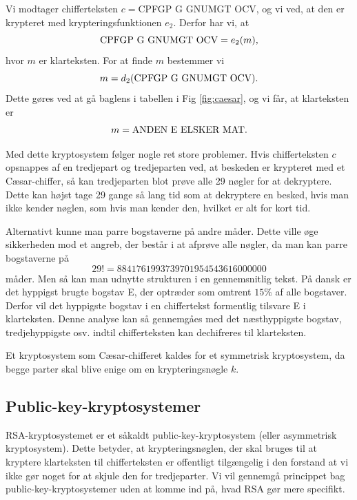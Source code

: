 \documentclass[12pt]{article}
\begin{document}
\begin{exa}
Vi modtager chifferteksten $c=$CPFGP G GNUMGT OCV, og vi ved, at den er krypteret med krypteringsfunktionen $e_2$. Derfor har vi, at 
\[
\textnormal{CPFGP G GNUMGT OCV} = e_2(m),
\]
hvor $m$ er klarteksten. For at finde $m$ bestemmer vi
\[
m = d_2(\textnormal{CPFGP G GNUMGT OCV}).
\]
Dette gøres ved at gå baglens i tabellen i Fig \ref{fig:caesar}, og vi får, at klarteksten er
\begin{align*}
m = \textnormal{ANDEN E ELSKER MAT}.
\end{align*}
\end{exa}
Med dette kryptosystem følger nogle ret store problemer. Hvis chifferteksten $c$ opsnappes af en tredjepart og tredjeparten ved, at beskeden er krypteret med et Cæsar-chiffer, så kan tredjeparten blot prøve alle 29 nøgler for at dekryptere. Dette kan højst tage 29 gange så lang tid som at dekryptere en besked, hvis man ikke kender nøglen, som hvis man kender den, hvilket er alt for kort tid. 

Alternativt kunne man parre bogstaverne på andre måder. Dette ville øge sikkerheden mod et angreb, der består i at afprøve alle nøgler, da man kan parre bogstaverne på 
\[
29! = 8841761993739701954543616000000
\]
måder. Men så kan man udnytte strukturen i en gennemsnitlig tekst. På dansk er det hyppigst brugte bogstav E, der optræder som omtrent $15\%$ af alle bogstaver. Derfor vil det hyppigste bogstav i en chiffertekst formentlig tilsvare E i klarteksten. Denne analyse kan så gennemgåes med det næsthyppigste bogstav, tredjehyppigste osv. indtil chifferteksten kan dechifreres til klarteksten. 

Et kryptosystem som Cæsar-chifferet kaldes for et symmetrisk kryptosystem, da begge parter skal blive enige om en krypteringsnøgle $k$. 

\subsection*{Public-key-kryptosystemer}
RSA-kryptosystemet er et såkaldt public-key-kryptosystem (eller asymmetrisk kryptosystem). Dette betyder, at krypteringsnøglen, der skal bruges til at kryptere klarteksten til chifferteksten er offentligt tilgængelig i den forstand at vi ikke gør noget for at skjule den for tredjeparter. Vi vil gennemgå princippet bag public-key-kryptosystemer uden at komme ind på, hvad RSA gør mere specifikt.
\end{document}
